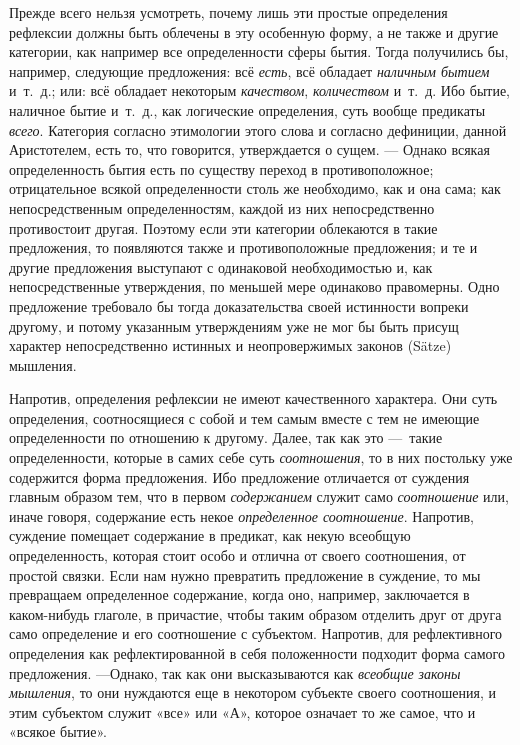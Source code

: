 Прежде всего нельзя усмотреть, почему лишь эти простые определения рефлексии
должны быть облечены в эту особенную форму, а не также и другие категории,
как например все определенности сферы бытия. Тогда получились бы, например,
следующие предложения: всё {\em есть}, всё обладает
{\em наличным бытием} и~т.~д.; или: всё обладает
некоторым {\em качеством},
{\em количеством} и~т.~д. Ибо бытие, наличное бытие
и~т.~д., как логические определения, суть вообще предикаты
{\em всего}. Категория согласно этимологии этого слова
и согласно дефиниции, данной Аристотелем, есть то, что говорится,
утверждается о сущем. — Однако всякая определенность бытия есть по существу
переход в противоположное; отрицательное всякой определенности столь же
необходимо, как и она сама; как непосредственным определенностям, каждой из
них непосредственно противостоит другая. Поэтому если эти категории
облекаются в такие предложения, то появляются также и противоположные
предложения; и те и другие предложения выступают с одинаковой
необходимостью и, как непосредственные утверждения, по меньшей мере
одинаково правомерны. Одно предложение требовало бы тогда доказательства
своей истинности вопреки другому, и потому указанным утверждениям уже не
мог бы быть присущ характер непосредственно истинных и неопровержимых
законов (Sätze) мышления.

Напротив, определения рефлексии не имеют качественного характера. Они суть
определения, соотносящиеся с собой и тем самым вместе с тем не имеющие
определенности по отношению к другому. Далее, так как это —~такие
определенности, которые в самих себе суть
{\em соотношения}, то в них постольку уже содержится
форма предложения. Ибо предложение отличается от суждения главным образом
тем, что в первом {\em содержанием} служит само
{\em соотношение} или, иначе говоря, содержание есть
некое {\em определенное соотношение}. Напротив,
суждение помещает содержание в предикат, как некую всеобщую определенность,
которая стоит особо и отлична от своего соотношения, от простой связки.
Если нам нужно превратить предложение в суждение, то мы превращаем
определенное содержание, когда оно, например, заключается в каком-нибудь
глаголе, в причастие, чтобы таким образом отделить друг от друга само
определение и его соотношение с субъектом. Напротив, для рефлективного
определения как рефлектированной в себя положенности подходит форма самого
предложения. —Однако, так как они высказываются как
{\em всеобщие законы мышления}, то они нуждаются еще в
некотором субъекте своего соотношения, и этим субъектом служит «все» или
«$А$», которое означает то же самое, что и «всякое бытие».

